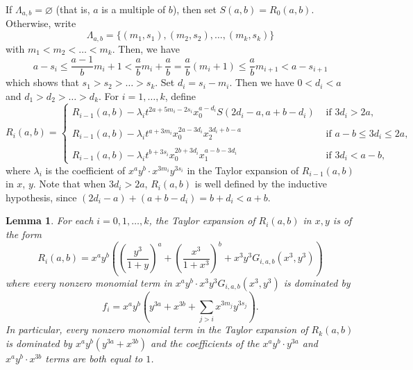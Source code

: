 \documentclass{article}
\newtheorem{lemma}{Lemma}
\begin{document}
If $\Lambda_{a,b} = \varnothing$ (that is, $a$ is a multiple of $b$), then set $S(a,b) = R_0(a,b)$. Otherwise, write 
\[\Lambda_{a,b}=\{(m_1,s_1),(m_2,s_2),\dots,(m_k,s_k)\}
\] 
with $m_1<m_2<\dots<m_k$. Then, we have 
\[
a-s_i\leq\frac{a-1}{b}m_i+1<\frac{a}{b}m_i+\frac{a}{b}=\frac{a}{b}(m_i+1)\leq \frac{a}{b}m_{i+1}<a-s_{i+1}
\]
which shows that $s_1>s_2>\dots > s_k$. Set $d_i=s_i-m_i$. Then we have $0<d_i<a$ and $d_1>d_2>\dots > d_k$.  For $i=1,\dots, k$, define
\[
R_i(a,b)=
\begin{cases}
    R_{i-1}(a,b) - \lambda_it^{2a+5m_i-2s_i}x_0^{a-d_i}S(2d_i-a,a+b-d_i)& \textrm{ if } 3d_i > 2a,\\
    \\
    R_{i-1}(a,b) - \lambda_it^{a+3m_i}x_0^{2a-3d_i}x_2^{3d_i+b-a} & \textrm{ if } a-b\leq 3d_i \leq 2a,\\
    \\
    R_{i-1}(a,b)- \lambda_it^{b+3s_i}x_0^{2b+3d_i}x_1^{a-b-3d_i}& \textrm{ if } 3d_i < a-b,
    
\end{cases}
\]
where $\lambda_i$ is the coefficient of $x^ay^b\cdot x^{3m_i}y^{3s_i}$ in the Taylor expansion of $R_{i-1}(a,b)$ in $x$, $y$. Note that when $3d_i>2a$, $R_i(a,b)$ is well defined by the inductive hypothesis, since $(2d_i-a)+(a+b-d_i)=b+d_i<a+b$.
\begin{lemma}
    For each $i=0,1,\dots,k$, the Taylor expansion of $R_i(a,b)$ in $x,y$ is of the form
    \[
    R_i(a,b)=x^ay^b\left(\left(\frac{y^3}{1+y}\right)^{a}+\left(\frac{x^3}{1+x^3}\right)^{b}+x^3y^3G_{i,a,b}(x^3,y^3)\right)
    \]
    where every nonzero monomial term in $x^ay^b\cdot x^3y^3G_{i,a,b}(x^3,y^3)$ is dominated by 
    \[
    f_i=x^ay^b(y^{3a}+x^{3b}+\sum_{j>i}x^{3m_j}y^{3s_j}).
    \]
    In particular, every nonzero monomial term in the Taylor expansion of $R_k(a,b)$ is dominated by $x^ay^b(y^{3a}+x^{3b})$ and the coefficients of the $x^ay^b\cdot y^{3a}$ and $x^ay^b\cdot x^{3b}$ terms are both equal to $1$.

\end{lemma}
\end{document}
